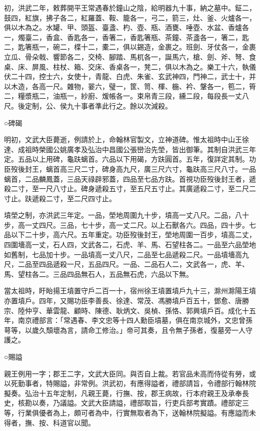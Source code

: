 初，洪武二年，敕葬開平王常遇春於鐘山之陰，給明器九十事，納之墓中。鉦二，鼓四，紅旗，拂子各二，紅羅蓋、鞍、籠各一，弓二，箭三，灶、釜、火爐各一，俱以木為之。水罐、甲、頭盔、臺盞、杓、壺、瓶、酒甕、唾壺、水盆、香爐各一，燭臺二，香盒、香匙各一，香箸二，香匙箸瓶、茶鐘、茶盞各一，箸二，匙二，匙箸瓶一，碗二，楪十二，橐二，俱以錫造，金裹之。班劍、牙仗各一，金裹立瓜、骨朵戟、響節各二，交椅、腳踏、馬杌各一，誕馬六，槍、劍、斧、弩、食桌、床、屏風、柱杖、箱、交床、香桌各一，凳二，俱以木為之。樂工十六，執儀伏二十四，控士六，女使十，青龍、白虎、朱雀、玄武神四，門神二，武士十，并以木造，各高一尺。雜物，翣六，璧一，筐、笥、楎、椸、衿、鞶各一，笣二，筲二，糧漿瓶二，油瓶一，紗廚、煖帳各一。束帛青三段，纁二段，每段長一丈八尺。後定制，公、侯九十事者準此行之。餘以次減殺。

○碑碣

明初，文武大臣薨逝，例請於上，命翰林官製文，立神道碑。惟太祖時中山王徐達、成祖時榮國公姚廣孝及弘治中昌國公張巒治先塋，皆出御筆。其制自洪武三年定。五品以上用碑，龜趺螭首。六品以下用碣，方趺圓首。五年，復詳定其制。功臣歿後封王，螭首高三尺二寸，碑身高九尺，廣三尺六寸，龜趺高三尺八寸。一品螭首，二品麟鳳蓋，三品天祿辟邪蓋，四品至七品方趺。首視功臣歿後封王者，遞殺二寸，至一尺八寸止。碑身遞殺五寸，至五尺五寸止。其廣遞殺二寸，至二尺二寸止。趺遞殺二寸，至二尺四寸止。

墳塋之制，亦洪武三年定。一品，塋地周圍九十步，墳高一丈八尺。二品，八十步，高一丈四尺。三品，七十步，高一丈二尺。以上石獸各六。四品，四十步。七品以下二十步，高六尺。五年重定。功臣歿後封王，塋地周圍一百步，墳高二丈，四圍墻高一丈，石人四，文武各二，石虎、羊、馬、石望柱各二。一品至六品塋地如舊制，七品加十步。一品墳高一丈八尺，二品至七品遞殺二尺。一品墳墻高九尺，二品至四品遞殺一尺，五品四尺。一品、二品石人二，文武各一，虎、羊、馬、望柱各二。三品四品無石人，五品無石虎，六品以下無。

當太祖時，盱眙揚王墳置守戶二百一十，宿州徐王墳置墳戶九十三，滁州滁陽王墳亦置墳戶。四年，又賜功臣李善長、徐達、常茂、馮勝墳戶百五十，鄧愈、唐勝宗、陸仲亨、華雲龍、顧時、陳德、耿炳文、吳楨、孫恪、郭興墳戶百。成化十五年，南京禮部言：「常遇春、李文忠等十四人勳臣墳墓，俱在南京城外，文忠曾孫萼等，以歲久頹壞為言，請命工修治。」帝可其奏，且令無子孫者，復墓旁一人守護之。

○賜謚

親王例用一字；郡王二字，文武大臣同。與否自上裁。若官品未高而侍從有勞，或以死勤事者，特賜謚，非常例。洪武初，有應得謚者，禮部請旨，令禮部行翰林院擬奏。弘治十五年定制，凡親王薨，行撫、按，郡王病故，行本府親王及承奉長史，核勘以奏，乃議謚。文武大臣請謚，禮部取旨，行吏兵部考實蹟。禮部定三等，行業俱優者為上，頗可者為中，行實無取者為下，送翰林院擬謚。有應謚而未得者，撫、按、科道官以聞。

